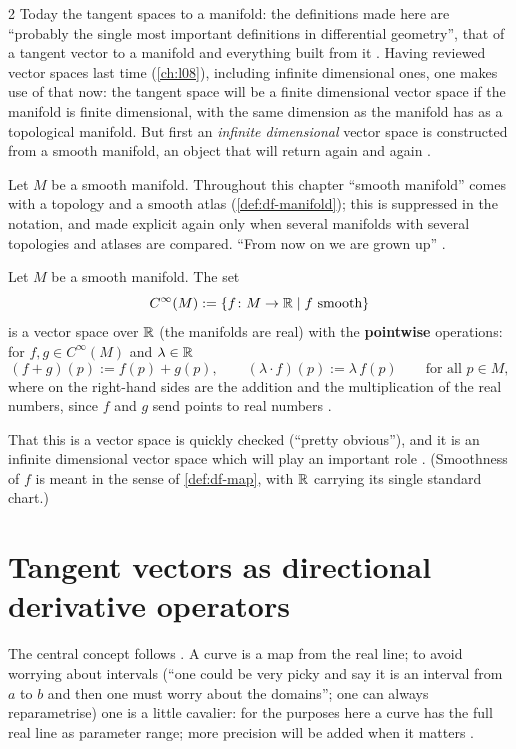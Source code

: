 \begin{paracol}{2}
Today the tangent spaces to a manifold: the definitions made here are ``probably the single most important definitions in differential geometry'', that of a tangent vector to a manifold and everything built from it . Having reviewed vector spaces last time
(\cref{ch:l08}), including infinite dimensional ones, one makes use of that now: the tangent space will be a finite dimensional vector space if the manifold is finite dimensional, with the same dimension as the manifold has as a topological manifold. But first an \emph{infinite
dimensional} vector space is constructed from a smooth manifold, an object that will return again and again  .

Let $M$ be a smooth manifold. Throughout this chapter ``smooth manifold'' comes with a topology and a smooth atlas (\cref{def:df-manifold}); this is suppressed in the notation, and made explicit again only when several manifolds with several topologies and atlases are compared. ``From now on we are grown up''  .

\begin{definition}\label{def:tv-cinf}
Let $M$ be a smooth manifold. The set
\[
  C^\infty(M):=\{f\colon M\to\mathbb{R}\mid f\text{ smooth}\}
\]
is a vector space over $\mathbb{R}$ (the manifolds are real) with the \textbf{pointwise} operations: for $f,g\in C^\infty(M)$ and $\lambda\in\mathbb{R}$
\[
  (f+g)(p):=f(p)+g(p),\qquad (\lambda\cdot f)(p):=\lambda\,f(p)\qquad\text{for all }p\in M,
\]
where on the right-hand sides are the addition and the multiplication of the real numbers, since $f$ and $g$ send points to real numbers    .
\end{definition}
That this is a vector space is quickly checked (``pretty obvious''), and it is an infinite dimensional vector space which will play an important role  .
(Smoothness of $f$ is meant in the sense of \cref{def:df-map}, with $\mathbb{R}$ carrying its single standard chart.)

\section{Tangent vectors as directional derivative operators}\label{sec:tv-vector}

The central concept follows . A curve is a map from the real line; to avoid worrying about intervals (``one could be very picky and say it is an interval from $a$ to $b$ and then one must worry about the domains''; one can always reparametrise) one is a little cavalier:
for the purposes here a curve has the full real line as parameter range; more precision will be added when it matters   .


\end{paracol}
